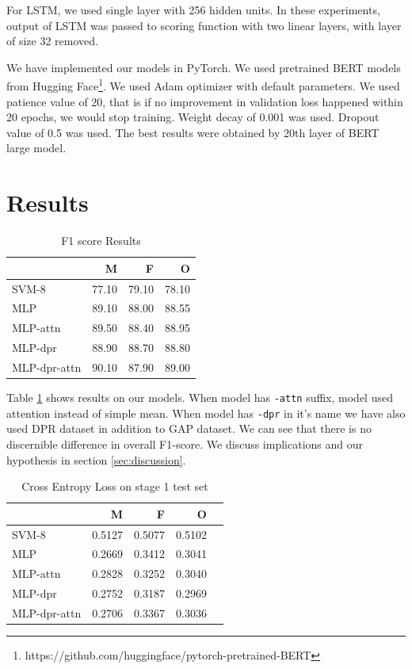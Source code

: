 \documentclass[11pt,a4paper]{article}
\begin{document}
For LSTM, we used single layer with 256 hidden units. In these experiments, output of LSTM was passed to scoring function with two linear layers, with layer of size 32 removed.

We have implemented our models in PyTorch. We used pretrained BERT models from Hugging Face\footnote{https://github.com/huggingface/pytorch-pretrained-BERT}. We used Adam optimizer with default parameters. We used patience value of 20, that is if no improvement in validation loss happened within 20 epochs, we would stop training. Weight decay of 0.001 was used. Dropout value of 0.5 was used. The best results were obtained by 20th layer of BERT large model.

\section{Results}
\label{sec:results}

\begin{table}
  \centering
  \begin{tabular}{|l|r|r|r|}
    \hline
    & M & F & O \\
    \hline
    SVM-8 & 77.10 & 79.10 & 78.10 \\
    \hline
    MLP             & 89.10 &88.00 & 88.55 \\
    MLP-attn         &  89.50 & 88.40 & 88.95 \\
    MLP-dpr           & 88.90 & 88.70 & 88.80 \\
    MLP-dpr-attn    & 90.10 & 87.90 & 89.00 \\
    \hline
  \end{tabular}
  \caption{F1 score Results}
  \label{tab:f1}
\end{table}

Table \ref{tab:f1} shows results on our models. When model has \texttt{-attn} suffix, model used attention instead of simple mean. When model has \texttt{-dpr} in it's name we have also used DPR dataset in addition to GAP dataset. We can see that there is no discernible difference in overall F1-score. We discuss implications and our hypothesis in section \ref{sec:discussion}.

\begin{table}
  \centering
  \begin{tabular}{|l|r|r|r|r|}
    \hline
    &M & F & O \\
    \hline
    SVM-8          & 0.5127 & 0.5077 & 0.5102 \\
    \hline
    MLP  & 0.2669 & 0.3412 & 0.3041 \\
    MLP-attn   & 0.2828 & 0.3252 & 0.3040 \\
    MLP-dpr      & 0.2752 & 0.3187 & 0.2969 \\
    MLP-dpr-attn & 0.2706 & 0.3367 & 0.3036 \\
    \hline
  \end{tabular}
  \caption{Cross Entropy Loss on stage 1 test set}
  \label{tab:ce1}
\end{table}
\end{document}
